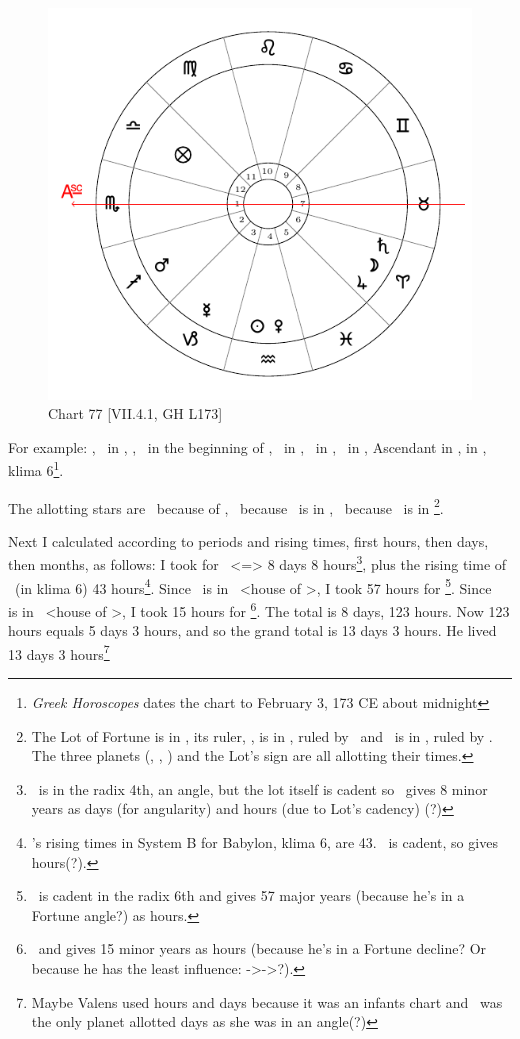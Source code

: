 \newpage
\begin{figure}
\centering
\vspace{-10pt}
\includegraphics[width=.68\textwidth]{charts/7_4_1}
\caption{Chart 77 [VII.4.1, GH L173]}
\label{fig:chart77}
\end{figure} 

\noindent For example: \Sun, \Venus\, in \Aquarius, \Moon, \Jupiter\, in the beginning of \Aries, \Saturn\, in \Aries, \Mars\, in \Sagittarius, \Mercury\, in \Capricorn, Ascendant in \Scorpio, \Fortune in \Libra, klima 6\footnote{\textit{Greek Horoscopes} dates the chart to February 3, 173 CE about midnight}. 

\noindent The allotting stars are \Venus\, because of \Libra, \Saturn\, because \Venus\, is in \Aquarius, \Mars\, because \Saturn\, is in \Aries\footnote{The Lot of Fortune is in \Libra, its ruler, \Venus, is in \Aquarius, ruled by \Saturn\, and \Saturn\, is in \Aries, ruled by \Mars. The three planets (\Venus, \Saturn, \Mars) and the Lot's sign are all allotting their times.}.

\noindent Next I calculated according to periods and rising times, first hours, then days, then months, as follows: I took for \Libra\, <=\Venus> 8 days 8 hours\footnote{\Venus\, is in the radix 4th, an angle, but the lot itself is cadent so \Venus\, gives 8 minor years as days (for angularity) and hours (due to Lot's cadency) (?)}, plus the rising time of \Libra\, (in klima 6) 43 hours\footnote{\Libra's rising times in System B for Babylon, klima 6, are 43. \Libra\, is cadent, so gives hours(?).}. Since \Venus\, is in \Aquarius\, <house of \Saturn>, I took 57 hours for \Saturn\footnote{\Saturn\, is cadent in the radix 6th and gives 57 major years (because he's in a Fortune angle?) as hours.}. Since \Saturn\, is in \Aries\, <house of \Mars>, I took 15 hours for \Mars\footnote{\Mars\, and gives 15 minor years as hours (because he's in a Fortune decline? Or because he has the least influence: \Venus->\Saturn->\Mars?).}. The total is 8 days, 123 hours. Now 123 hours equals 5 days 3 hours, and so the grand total is 13 days 3 hours. He lived 13 days 3 hours\footnote{Maybe Valens used hours and days because it was an infants chart and \Venus\, was the only planet allotted days as she was in an angle(?)}

